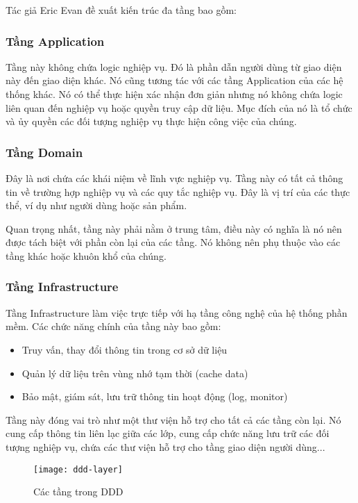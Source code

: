 Tác giả Eric Evan đề xuất kiến trúc đa tầng bao gồm:

\subsubsection{Tầng Application}

Tầng này không chứa logic nghiệp vụ. Đó là phần dẫn người dùng từ giao diện này đến giao diện khác. Nó cũng tương tác với các tầng Application của các hệ thống khác. Nó có thể thực hiện xác nhận đơn giản nhưng nó không chứa logic liên quan đến nghiệp vụ hoặc quyền truy cập dữ liệu. Mục đích của nó là tổ chức và ủy quyền các đối tượng nghiệp vụ thực hiện công việc của chúng.

\subsubsection{Tầng Domain}

Đây là nơi chứa các khái niệm về lĩnh vực nghiệp vụ. Tầng này có tất cả thông tin về trường hợp nghiệp vụ và các quy tắc nghiệp vụ. Đây là vị trí của các thực thể, ví dụ như người dùng hoặc sản phẩm.

Quan trọng nhất, tầng này phải nằm ở trung tâm, điều này có nghĩa là nó nên được tách biệt với phần còn lại của các tầng. Nó không nên phụ thuộc vào các tầng khác hoặc khuôn khổ của chúng.

\subsubsection{Tầng Infrastructure}

Tầng Infrastructure làm việc trực tiếp với hạ tầng công nghệ của hệ thống phần mềm. Các chức năng chính của tầng này bao gồm:

\begin{itemize}
	\item Truy vấn, thay đổi thông tin trong cơ sở dữ liệu
	\item Quản lý dữ liệu trên vùng nhớ tạm thời (cache data)
	\item Bảo mật, giám sát, lưu trữ thông tin hoạt động (log, monitor)
\end{itemize}

Tầng này đóng vai trò như một thư viện hỗ trợ cho tất cả các tầng còn lại. Nó cung cấp thông tin liên lạc giữa các lớp, cung cấp chức năng lưu trữ các đối tượng nghiệp vụ, chứa các thư viện hỗ trợ cho tầng giao diện người dùng...

\begin{figure}[H]
	\centering
	\texttt{[image: ddd-layer]}
	\caption{Các tầng trong DDD}
\end{figure}

